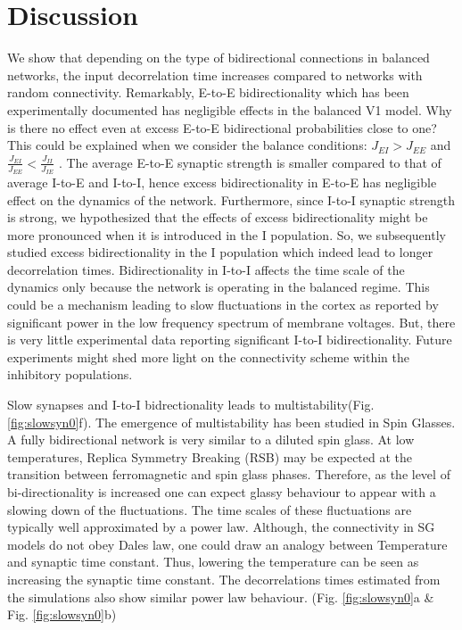 \section{Discussion}
We show that depending on the type of bidirectional connections in balanced networks, the input decorrelation time increases compared to networks with random connectivity. Remarkably, E-to-E bidirectionality which has been experimentally documented has negligible effects in the balanced V1 model. 
Why is there no effect even at excess E-to-E bidirectional probabilities close to one?  This could be explained when we consider the balance conditions: $J_{EI} > J_{EE}$ and $\frac{J_{EI}}{J_{EE}} < \frac{J_{II}}{J_{IE}}$ \cite{carl1998}. The average E-to-E synaptic strength is smaller compared to that of average I-to-E and I-to-I, hence excess bidirectionality in E-to-E has negligible effect on the dynamics of the network. Furthermore, since I-to-I synaptic strength is strong, we hypothesized that the effects of excess bidirectionality might be more pronounced when it is introduced in the I population. So, we subsequently studied excess bidirectionality in the I population which indeed lead to longer decorrelation times. Bidirectionality in I-to-I affects the time scale of the dynamics only because the network is operating in the balanced regime. This could be a mechanism leading to slow fluctuations in the cortex as reported by significant power in the low frequency spectrum of membrane voltages. But, there is very little experimental data reporting significant I-to-I bidirectionality. Future experiments might shed more light on the connectivity scheme within the inhibitory populations.

Slow synapses and I-to-I bidrectionality leads to multistability(Fig. \ref{fig:slowsyn0}f). The emergence of multistability has been studied in Spin Glasses. A fully bidirectional network is very similar to a diluted spin glass\cite{megard1987spin}. At low temperatures, Replica Symmetry Breaking (RSB) may be expected at the transition between ferromagnetic and spin glass phases. Therefore, as the level of bi-directionality is increased one can expect glassy behaviour to appear with a slowing down of the fluctuations\cite{Crisanti1987, Crisanti1988}. The time scales of these fluctuations are typically well approximated by a power law. Although, the connectivity in SG models do not obey Dales law, one could draw an analogy between Temperature and synaptic time constant. Thus, lowering the temperature can be seen as increasing the synaptic time constant. The decorrelations times estimated from the simulations also show similar power law behaviour. (Fig. \ref{fig:slowsyn0}a \& Fig. \ref{fig:slowsyn0}b) \\

